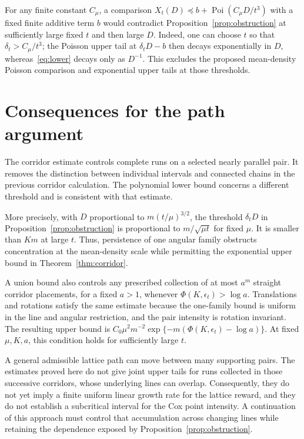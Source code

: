 \documentclass[11pt,letterpaper]{article}
\begin{document}
For any finite constant $C_\mu$, a comparison $X_t(D)\preceq b+\operatorname{Poi}(C_\mu D/t^3)$ with a fixed finite additive term $b$ would contradict Proposition~\ref{prop:obstruction} at sufficiently large fixed $t$ and then large $D$. Indeed, one can choose $t$ so that $\delta_t>C_\mu/t^3$; the Poisson upper tail at $\delta_tD-b$ then decays exponentially in $D$, whereas~\eqref{eq:lower} decays only as $D^{-1}$. This excludes the proposed mean-density Poisson comparison and exponential upper tails at those thresholds.

\section{Consequences for the path argument}

The corridor estimate controls complete runs on a selected nearly parallel pair. It removes the distinction between individual intervals and connected chains in the previous corridor calculation. The polynomial lower bound concerns a different threshold and is consistent with that estimate.

More precisely, with $D$ proportional to $m(t/\mu)^{3/2}$, the threshold $\delta_tD$ in Proposition~\ref{prop:obstruction} is proportional to $m/\sqrt{\mu t}$ for fixed $\mu$. It is smaller than $Km$ at large $t$. Thus, persistence of one angular family obstructs concentration at the mean-density scale while permitting the exponential upper bound in Theorem~\ref{thm:corridor}.

A union bound also controls any prescribed collection of at most $a^m$ straight corridor placements, for a fixed $a>1$, whenever $\Phi(K,\epsilon_t)>\log a$. Translations and rotations satisfy the same estimate because the one-family bound is uniform in the line and angular restriction, and the pair intensity is rotation invariant. The resulting upper bound is $C_0\mu^2m^{-2}\exp\{-m(\Phi(K,\epsilon_t)-\log a)\}$. At fixed $\mu,K,a$, this condition holds for sufficiently large $t$.

A general admissible lattice path can move between many supporting pairs. The estimates proved here do not give joint upper tails for runs collected in those successive corridors, whose underlying lines can overlap. Consequently, they do not yet imply a finite uniform linear growth rate for the lattice reward, and they do not establish a subcritical interval for the Cox point intensity. A continuation of this approach must control that accumulation across changing lines while retaining the dependence exposed by Proposition~\ref{prop:obstruction}.



\end{document}
